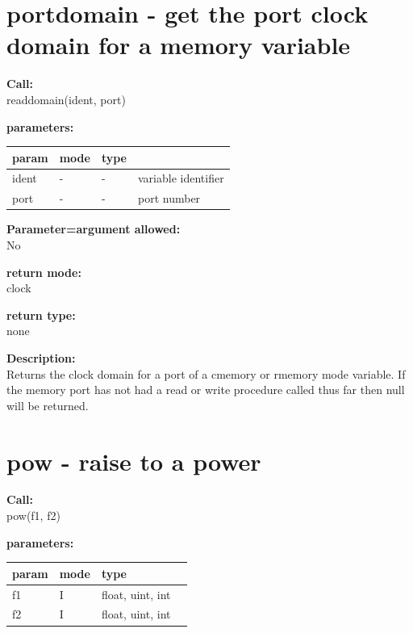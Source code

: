     \section{portdomain - get the port clock domain for a memory variable}\label{sec:ifportdomain}
        
        {\bf Call:} \\
        readdomain(ident, port)
        
        {\bf parameters:} \\
        \begin{tabular}{| l | l | l | l |}
        \hline
        param  & mode & type & \\
        \hline \hline
        ident & - &  -  & variable identifier \\ \hline
        port  & - &  -  & port number \\ \hline
        \end{tabular}
        
        {\bf Parameter=argument allowed:} \\
        No
        
        {\bf return mode:} \\
        clock

        {\bf return type:} \\
        none
        
        {\bf Description:} \\
        Returns the clock domain for a port of a cmemory or rmemory mode
        variable. If the memory port has not had a read or write procedure
        called thus far then null will be returned.





    \section{pow - raise to a power}\label{sec:ifpow}
           
        {\bf Call:} \\
        pow(f1, f2)
        
        {\bf parameters:} \\
        \begin{tabular}{| l | l | l | l |}
        \hline
        param  & mode & type & \\
        \hline \hline
        f1 & I & float, uint, int & \\ \hline
        f2 & I & float, uint, int & \\ \hline
        \end{tabular}
        
